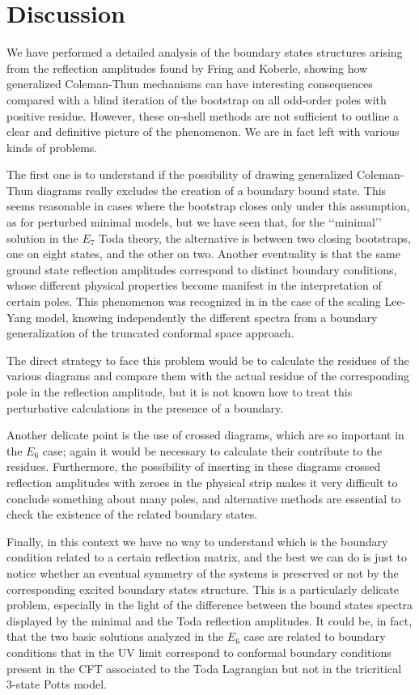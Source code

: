 \documentclass[a4paper,12pt]{report}
\begin{document}
\section{Discussion}

We have performed a detailed analysis of the boundary states structures arising from the reflection amplitudes
found by Fring and Koberle, showing how generalized Coleman-Thun mechanisms can have interesting consequences
compared with a blind iteration of the bootstrap on all odd-order poles with positive residue. However, these
on-shell methods are not sufficient to outline a clear and definitive picture of the phenomenon. We are in fact
left with various kinds of problems.

The first one is to understand if the possibility of drawing generalized Coleman-Thun diagrams really excludes the
creation of a boundary bound state. This seems reasonable in cases where the bootstrap closes only under this
assumption, as for perturbed minimal models, but we have seen that, for the \lq\lq minimal\rq\rq \, solution in
the $E_{7}$ Toda theory, the alternative is between two closing bootstraps, one on eight states, and the other on
two. Another eventuality is that the same ground state reflection amplitudes correspond to distinct boundary
conditions, whose different physical properties become manifest in the interpretation of certain poles. This
phenomenon was recognized in \cite{tateo} in the case of the scaling Lee-Yang model, knowing independently the
different spectra from a boundary generalization of the truncated conformal space approach.

The direct strategy to face this problem would be to calculate the residues of the various diagrams and compare
them with the actual residue of the corresponding pole in the reflection amplitude, but it is not known how to
treat this perturbative calculations in the presence of a boundary.

Another delicate point is the use of crossed diagrams, which are so important in the $E_{6}$ case; again it would
be necessary to calculate their contribute to the residues. Furthermore, the possibility of inserting in these
diagrams crossed reflection amplitudes with zeroes in the physical strip makes it very difficult to conclude
something about many poles, and alternative methods are essential to check the existence of the related boundary
states.

Finally, in this context we have no way to understand which is the boundary condition related to a certain
reflection matrix, and the best we can do is just to notice whether an eventual symmetry of the systems is
preserved or not by the corresponding excited boundary states structure. This is a particularly delicate problem,
especially in the light of the difference between the bound states spectra displayed by the minimal and the Toda
reflection amplitudes. It could be, in fact, that the two basic solutions analyzed in the $E_{6}$ case are
related to boundary conditions that in the UV limit correspond to conformal boundary conditions present in the CFT
associated to the Toda Lagrangian but not in the tricritical 3-state Potts model.
\end{document}

